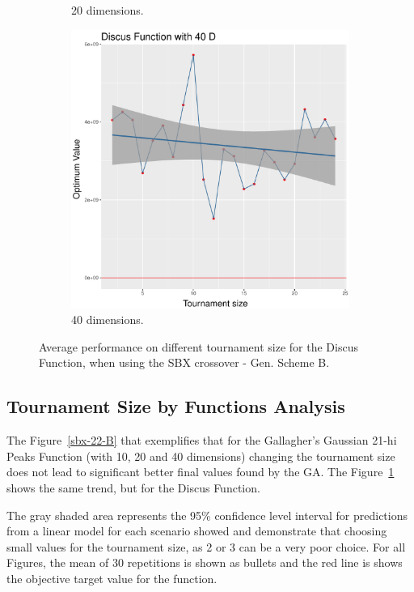 \begin{figure}[t]
\begin{subfigure}[b]{0.33\textwidth}
		\caption{20 dimensions.}
	\end{subfigure}
	\begin{subfigure}[b]{0.33\textwidth}
		\centering
		\includegraphics[width=\textwidth]{img/unimodal_2n2n_11_dim_40.pdf}
		\caption{40 dimensions.}
	\end{subfigure}
	\caption{Average performance on different tournament size for the Discus Function, when using the SBX crossover - Gen. Scheme B.}
	\label{sbx-11-B}
\end{figure}


\subsection{Tournament Size by Functions Analysis}
The Figure~\ref{sbx-22-B} that exemplifies that for the Gallagher's Gaussian 21-hi Peaks Function (with 10, 20 and 40 dimensions) changing the tournament size does not lead to significant better final values found by the GA. The Figure~\ref{sbx-11-B} shows the same trend, but for the Discus Function.

The gray shaded area represents the 95\% confidence level interval for predictions from a linear model for each scenario showed and demonstrate that choosing small values for the tournament size, as 2 or 3 can be a very poor choice. For all Figures, the mean of 30 repetitions is shown as bullets and the red line is shows the objective target value for the function.


